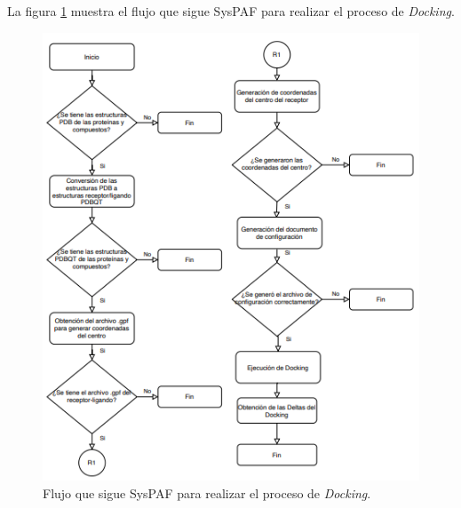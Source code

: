 {\noindent La figura \ref{flujo_dock} muestra el flujo que sigue SysPAF para realizar el proceso de \textit{Docking}.

\begin{figure}[H]
    \centering
    \includegraphics[scale=.65]{Capitulo4/Documentos/imagenes_entorno/docking-flujo.png}
    \caption{Flujo que sigue SysPAF para realizar el proceso de \textit{Docking}.}
    \label{flujo_dock}
\end{figure}

}

